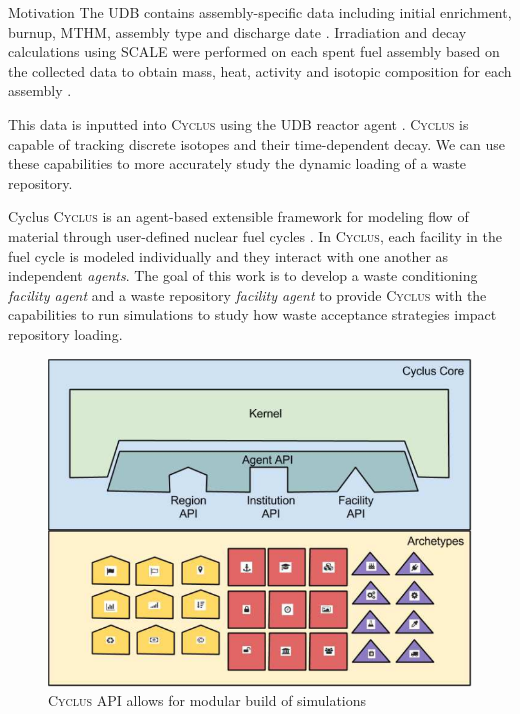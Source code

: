 \documentclass[final]{beamer}
\newlength{\onecolwid}
\newlength{\threecolwid}
\newcommand{\Cyclus}{\textsc{Cyclus}\xspace}%
\begin{document}
\begin{frame}[t]
\begin{columns}[t,totalwidth=\threecolwid]
\begin{column}{\onecolwid}
\begin{block}{Motivation}
The \gls{UDB} contains assembly-specific data including initial enrichment, 
burnup, \gls{MTHM}, assembly type and discharge date \cite{peterson_fuel_2015}. 
Irradiation and decay calculations using SCALE \cite{bowman_scale_2011} were 
performed on each spent fuel assembly based on the collected data to obtain 
mass, heat, activity and isotopic composition for each assembly 
\cite{peterson_additional_2017}. 

This data is inputted into \Cyclus using the UDB reactor agent \cite{}. 
\Cyclus is capable of tracking discrete isotopes and their time-dependent decay. 
We can use these capabilities to more accurately study the dynamic loading 
of a waste repository. 

\end{block}


\begin{block}{Cyclus}
\Cyclus is an agent-based extensible framework for modeling flow of material 
through user-defined nuclear fuel cycles \cite{huff_fundamental_2016}. 
In \Cyclus, each facility in the fuel cycle is modeled individually 
and they interact with one another as independent \textit{agents}. 
The goal of this work is to develop a waste conditioning \textit{facility agent} 
and a waste repository \textit{facility agent} to provide \Cyclus with 
the capabilities to run simulations to study how waste acceptance 
strategies impact repository loading. 
\begin{figure}
	\includegraphics[width=0.9\linewidth]{Cyclus_graph}
	\caption{\Cyclus API allows for modular build of simulations \cite{huff_fundamental_2016}}
\end{figure}


\end{block}
\end{column}
\end{columns}
\end{frame}
\end{document}
